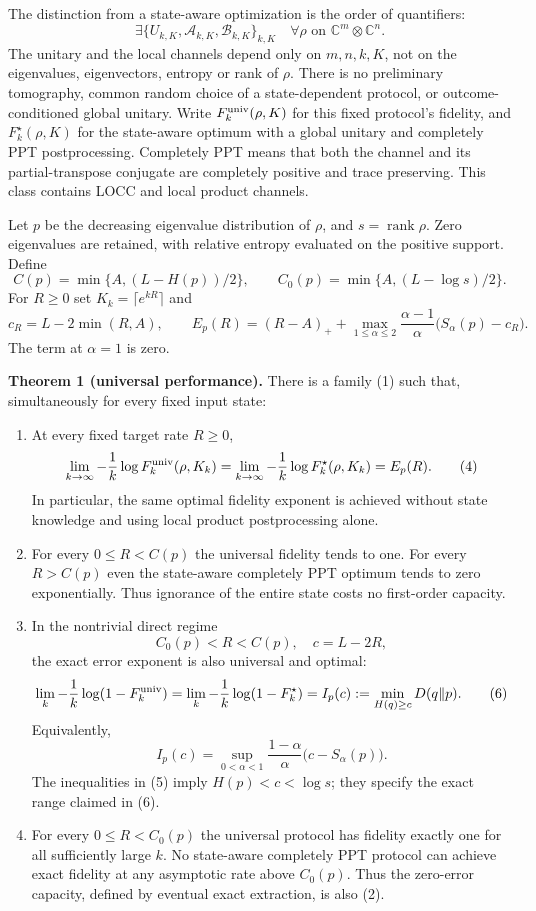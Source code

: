 \documentclass[11pt]{article}
\begin{document}
The distinction from a state-aware optimization is the order of quantifiers: \[
 \exists\{U_{k,K},\mathcal A_{k,K},\mathcal B_{k,K}\}_{k,K}
 \quad\forall\rho\text{ on }\mathbb C^m\otimes\mathbb C^n.
 \tag{1}
\] The unitary and the local channels depend only on \(m,n,k,K\), not on the eigenvalues, eigenvectors, entropy or rank of \(\rho\). There is no preliminary tomography, common random choice of a state-dependent protocol, or outcome-conditioned global unitary. Write \(F_k^{\rm univ}(\rho,K)\) for this fixed protocol's fidelity, and \(F_k^\star(\rho,K)\) for the state-aware optimum with a global unitary and completely PPT postprocessing. Completely PPT means that both the channel and its partial-transpose conjugate are completely positive and trace preserving. This class contains LOCC and local product channels.

Let \(p\) be the decreasing eigenvalue distribution of \(\rho\), and \(s=\operatorname{rank}\rho\). Zero eigenvalues are retained, with relative entropy evaluated on the positive support. Define \[
 C(p)=\min\{A,(L-H(p))/2\},\qquad
 C_0(p)=\min\{A,(L-\log s)/2\}.
 \tag{2}
\] For \(R\ge0\) set \(K_k=\lceil e^{kR}\rceil\) and \[
 c_R=L-2\min(R,A),\qquad
 E_p(R)=(R-A)_++\max_{1\le\alpha\le2}
 \frac{\alpha-1}{\alpha}\bigl(S_\alpha(p)-c_R\bigr).
 \tag{3}
\] The term at \(\alpha=1\) is zero.

\textbf{Theorem 1 (universal performance).} There is a family (1) such that, simultaneously for every fixed input state:

\begin{enumerate}
\def\labelenumi{(\alph{enumi})}
\item
  At every fixed target rate \(R\ge0\), \[
   \lim_{k\to\infty}-\frac1k\log F_k^{\rm univ}(\rho,K_k)
   =\lim_{k\to\infty}-\frac1k\log F_k^\star(\rho,K_k)=E_p(R).
   \tag{4}
  \] In particular, the same optimal fidelity exponent is achieved without state knowledge and using local product postprocessing alone.
\item
  For every \(0\le R<C(p)\) the universal fidelity tends to one. For every \(R>C(p)\) even the state-aware completely PPT optimum tends to zero exponentially. Thus ignorance of the entire state costs no first-order capacity.
\item
  In the nontrivial direct regime \[
   C_0(p)<R<C(p),\quad c=L-2R,
   \tag{5}
  \] the exact error exponent is also universal and optimal: \[
   \lim_k-\frac1k\log(1-F_k^{\rm univ})
   =\lim_k-\frac1k\log(1-F_k^\star)
   =I_p(c):=\min_{H(q)\ge c}D(q\|p).
   \tag{6}
  \] Equivalently, \[
   I_p(c)=\sup_{0<\alpha<1}\frac{1-\alpha}{\alpha}
               \bigl(c-S_\alpha(p)\bigr).
   \tag{7}
  \] The inequalities in (5) imply \(H(p)<c<\log s\); they specify the exact range claimed in (6).
\item
  For every \(0\le R<C_0(p)\) the universal protocol has fidelity exactly one for all sufficiently large \(k\). No state-aware completely PPT protocol can achieve exact fidelity at any asymptotic rate above \(C_0(p)\). Thus the zero-error capacity, defined by eventual exact extraction, is also (2).
\end{enumerate}
\end{document}
